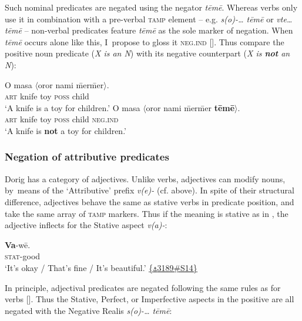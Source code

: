 \documentclass[output=paper,colorlinks,citecolor=brown,draft]{langscibook}
\begin{document}
Such nominal predicates are negated using the negator \textit{tēmē}. Whereas verbs only use it in combination with a pre-verbal \textsc{tamp} element – e.g. \textit{s(o)-… tēmē} or \textit{vte… tēmē} – non-verbal predicates feature \textit{tēmē} as the sole marker of negation. When \textit{tēmē} occurs alone like this, I~propose to gloss it \textsc{neg.ind} []. Thus compare the positive noun predicate  (\textit{X is an N}) with its negative counterpart  (\textit{X is \textbf{not} an N}):

\ea\label{ex:dor:toy}
    \ea\label{ex:dor:toy1}
        \gll  O masa \textrm{${\langle}$}oror nami \={m}er\={m}er\textrm{${\rangle}$}.\\ 
              \textsc{art} knife toy \textsc{poss} child\\
        \glt ‘A knife is a toy for children.’ 
    \ex\label{ex:dor:toy2}
        \gll   O masa \textrm{${\langle}$}oror nami \={m}er\={m}er \textbf{tēmē}\textrm{${\rangle}$}.\\
              \textsc{art} knife toy \textsc{poss} child \textsc{neg.ind}\\
        \glt ‘A knife is \textbf{not} a toy for children.’   
    \z
\z 

\subsubsection{Negation of attributive predicates}\label{sec:dor2.3.2}

Dorig has a category of adjectives. Unlike verbs, adjectives can modify nouns, by~means of the ‘Attributive’ prefix \textit{v(e)-} (cf.  above). In spite of their structural difference, adjectives behave the same as stative verbs in predicate position, and take the same array of \textsc{tamp} markers. Thus if the meaning is stative as in , the adjective inflects for the Stative aspect \textit{v(a)-}:

\ea\label{ex:dor:vawe}
    \gll \textbf{Va}-wē.\\
         \textsc{stat-}good\\
    \glt ‘It’s okay / That’s fine / It’s beautiful.’ \quad  \href{https://doi.org/10.24397/pangloss-0003189#S14}{\{\texttt{⚓}3189\#S14\}}
\z 

In principle, adjectival predicates are negated following the same rules as for verbs []. Thus the Stative, Perfect, or Imperfective aspects in the positive are all negated with the Negative Realis  \textit{s(o)-… tēmē}:
\end{document}
